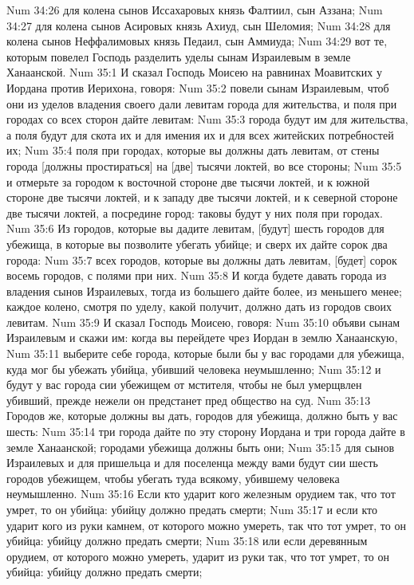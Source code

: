 Num 34:26  для колена сынов Иссахаровых князь Фалтиил, сын Аззана;
Num 34:27  для колена сынов Асировых князь Ахиуд, сын Шеломия;
Num 34:28  для колена сынов Неффалимовых князь Педаил, сын Аммиуда;
Num 34:29  вот те, которым повелел Господь разделить уделы сынам Израилевым в земле Ханаанской.
Num 35:1  И сказал Господь Моисею на равнинах Моавитских у Иордана против Иерихона, говоря:
Num 35:2  повели сынам Израилевым, чтоб они из уделов владения своего дали левитам города для жительства, и поля при городах со всех сторон дайте левитам:
Num 35:3  города будут им для жительства, а поля будут для скота их и для имения их и для всех житейских потребностей их;
Num 35:4  поля при городах, которые вы должны дать левитам, от стены города [должны простираться] на [две] тысячи локтей, во все стороны;
Num 35:5  и отмерьте за городом к восточной стороне две тысячи локтей, и к южной стороне две тысячи локтей, и к западу две тысячи локтей, и к северной стороне две тысячи локтей, а посредине город: таковы будут у них поля при городах.
Num 35:6  Из городов, которые вы дадите левитам, [будут] шесть городов для убежища, в которые вы позволите убегать убийце; и сверх их дайте сорок два города:
Num 35:7  всех городов, которые вы должны дать левитам, [будет] сорок восемь городов, с полями при них.
Num 35:8  И когда будете давать города из владения сынов Израилевых, тогда из большего дайте более, из меньшего менее; каждое колено, смотря по уделу, какой получит, должно дать из городов своих левитам.
Num 35:9  И сказал Господь Моисею, говоря:
Num 35:10  объяви сынам Израилевым и скажи им: когда вы перейдете чрез Иордан в землю Ханаанскую,
Num 35:11  выберите себе города, которые были бы у вас городами для убежища, куда мог бы убежать убийца, убивший человека неумышленно;
Num 35:12  и будут у вас города сии убежищем от мстителя, чтобы не был умерщвлен убивший, прежде нежели он предстанет пред общество на суд.
Num 35:13  Городов же, которые должны вы дать, городов для убежища, должно быть у вас шесть:
Num 35:14  три города дайте по эту сторону Иордана и три города дайте в земле Ханаанской; городами убежища должны быть они;
Num 35:15  для сынов Израилевых и для пришельца и для поселенца между вами будут сии шесть городов убежищем, чтобы убегать туда всякому, убившему человека неумышленно.
Num 35:16  Если кто ударит кого железным орудием так, что тот умрет, то он убийца: убийцу должно предать смерти;
Num 35:17  и если кто ударит кого из руки камнем, от которого можно умереть, так что тот умрет, то он убийца: убийцу должно предать смерти;
Num 35:18  или если деревянным орудием, от которого можно умереть, ударит из руки так, что тот умрет, то он убийца: убийцу должно предать смерти;
